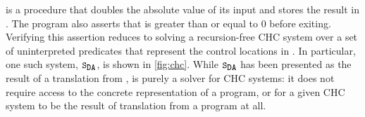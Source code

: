 \begin{figure}[t]
  \centering
  \begin{floatrow}[2]
    {
    }
  \end{floatrow}
\end{figure}
%
 is a procedure that doubles the absolute value of
its input and stores the result in .
The program also asserts that  is greater than or equal to $0$
before exiting.
Verifying this assertion reduces to solving a recursion-free
CHC system over a set of uninterpreted predicates that represent
the control locations in .
%
In particular, one such system, $\mcchc$, is shown in
\autoref{fig:chc}.
%
%
While $\mcchc$ has been presented as the result
of a translation from , \sys is
purely a solver for CHC systems: it does not require access to the
concrete representation of a program, or for a given CHC system to be
the result of translation from a program at all.

